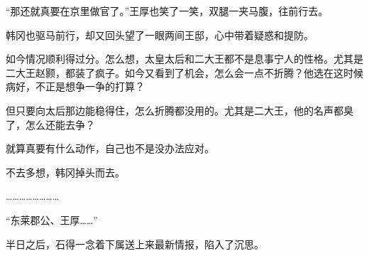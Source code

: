 “那还就真要在京里做官了。”王厚也笑了一笑，双腿一夹马腹，往前行去。

韩冈也驱马前行，却又回头望了一眼两间王邸，心中带着疑惑和提防。

如今情况顺利得过分。怎么想，太皇太后和二大王都不是息事宁人的性格。尤其是二大王赵颢，都装了疯子。如今又看到了机会，怎么会一点不折腾？他选在这时候病好，不正是想争一争的打算？

但只要向太后那边能稳得住，怎么折腾都没用的。尤其是二大王，他的名声都臭了，怎么还能去争？

就算真要有什么动作，自己也不是没办法应对。

不去多想，韩冈掉头而去。

……………………

“东莱郡公、王厚……”

半日之后，石得一念着下属送上来最新情报，陷入了沉思。

